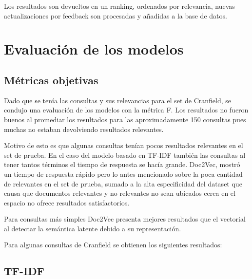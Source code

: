 \documentclass[12pt]{llncs}
\begin{document}
Los resultados son devueltos en un ranking, ordenados por relevancia, nuevas actualizaciones por feedback son procesadas y añadidas a la base de datos.

\section{Evaluación de los modelos}

\subsection{Métricas objetivas}

Dado que se tenía las consultas y sus relevancias para el set de Cranfield, se condujo una evaluación de los modelos con la métrica F. Los resultados no fueron buenos al promediar los resultados para las aproximadamente 150 consultas pues muchas no estaban devolviendo resultados relevantes.

Motivo de esto es que algunas consultas tenían pocos resultados relevantes en el set de prueba. En el caso del modelo basado en TF-IDF también las consultas al tener tantos términos el tiempo de respuesta se hacía grande. Doc2Vec, mostró un tiempo de respuesta rápido pero lo antes mencionado sobre la poca cantidad de relevantes en el set de prueba, sumado a la alta especificidad del dataset que causa que documentos relevantes y no relevantes no sean ubicados cerca en el espacio no ofrece resultados satisfactorios.

Para consultas más simples Doc2Vec presenta mejores resultados que el vectorial al detectar la semántica latente debido a su representación.

Para algunas consultas de Cranfield se obtienen los siguientes resultados:

\subsection*{TF-IDF}
\end{document}
